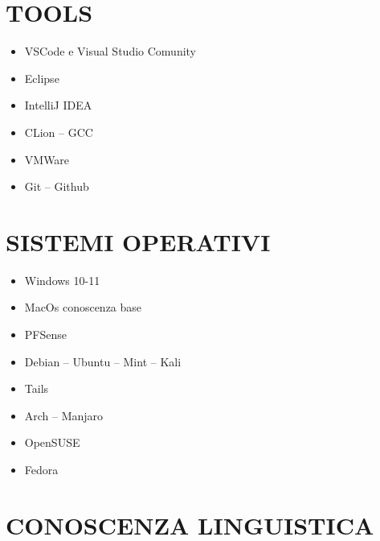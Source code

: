 \documentclass{clean_cv}
\begin{document}
    \section{TOOLS}
        \begin{multicols}{2}
            \begin{itemize}
                \item VSCode e Visual Studio Comunity
                \item Eclipse
                \item IntelliJ IDEA
                \item CLion -- GCC
                \item VMWare
                \item Git -- Github
            \end{itemize}
        \end{multicols}
    
    \newpage

    \section{SISTEMI OPERATIVI}
        \begin{multicols}{3}
            \begin{itemize}
                \item Windows 10-11
                \item MacOs conoscenza base
                \item PFSense
                \item Debian -- Ubuntu -- Mint -- Kali
                \item Tails
                \item Arch -- Manjaro
                \item OpenSUSE
                \item Fedora
            \end{itemize}
        \end{multicols}
    
    \section{CONOSCENZA LINGUISTICA}
        \begin{datetabular}{9em}
        \end{datetabular}
\end{document}
